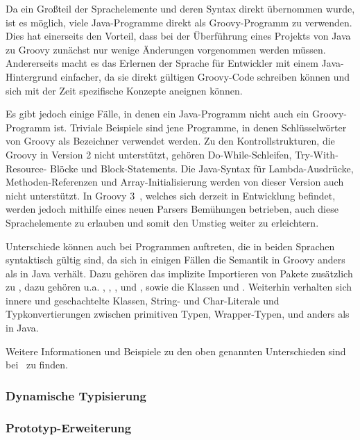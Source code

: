 	Da ein Großteil der Sprachelemente und deren Syntax direkt übernommen wurde, ist es möglich, viele Java-Programme direkt als Groovy-Programm zu verwenden.
	Dies hat einerseits den Vorteil, dass bei der Überführung eines Projekts von Java zu Groovy zunächst nur wenige Änderungen vorgenommen werden müssen.
	Andererseits macht es das Erlernen der Sprache für Entwickler mit einem Java-Hintergrund einfacher, da sie direkt gültigen Groovy-Code schreiben können und sich mit der Zeit spezifische Konzepte aneignen können.

	Es gibt jedoch einige Fälle, in denen ein Java-Programm nicht auch ein Groovy-Programm ist.
	Triviale Beispiele sind jene Programme, in denen Schlüsselwörter von Groovy als Bezeichner verwendet werden.
	Zu den Kontrollstrukturen, die Groovy in Version 2 nicht unterstützt, gehören Do-While-Schleifen, Try-With-Resource- Blöcke und Block-Statements.
	Die Java-Syntax für Lambda-Ausdrücke, Methoden-Referenzen und Array-Initialisierung werden von dieser Version auch nicht unterstützt.
	In Groovy 3~\cite{groovy-lang:release3}, welches sich derzeit in Entwicklung befindet, werden jedoch mithilfe eines neuen Parsers Bemühungen betrieben, auch diese Sprachelemente zu erlauben und somit den Umstieg weiter zu erleichtern.

	Unterschiede können auch bei Programmen auftreten, die in beiden Sprachen syntaktisch gültig sind, da sich in einigen Fällen die Semantik in Groovy anders als in Java verhält.
	Dazu gehören das implizite Importieren von Pakete zusätzlich zu , dazu gehören {u.a.} , , ,  und , sowie die Klassen  und .
	Weiterhin verhalten sich innere und geschachtelte Klassen, String- und Char-Literale und Typkonvertierungen zwischen primitiven Typen, Wrapper-Typen,  und  anders als in Java.

	Weitere Informationen und Beispiele zu den oben genannten Unterschieden sind bei~\cite{groovy-lang:differences} zu finden.

	\subsubsection{Dynamische Typisierung}\label{subsubsec:dynamische-typisierung}


	\subsubsection{Prototyp-Erweiterung}

